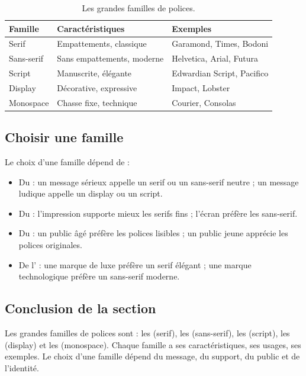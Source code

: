 \begin{table}[h!]
\centering
\begin{tabular}{@{}lll@{}}
\toprule
\textbf{Famille} & \textbf{Caractéristiques} & \textbf{Exemples} \\
\midrule
Serif & Empattements, classique & Garamond, Times, Bodoni \\
Sans-serif & Sans empattements, moderne & Helvetica, Arial, Futura \\
Script & Manuscrite, élégante & Edwardian Script, Pacifico \\
Display & Décorative, expressive & Impact, Lobster \\
Monospace & Chasse fixe, technique & Courier, Consolas \\
\bottomrule
\end{tabular}
\caption{Les grandes familles de polices.}
\end{table}

\subsection{Choisir une famille}

Le choix d'une famille dépend de :

\begin{itemize}
    \item Du  : un message sérieux appelle un serif ou un sans-serif neutre ; un message ludique appelle un display ou un script.
    \item Du  : l'impression supporte mieux les serifs fins ; l'écran préfère les sans-serif.
    \item Du  : un public âgé préfère les polices lisibles ; un public jeune apprécie les polices originales.
    \item De l' : une marque de luxe préfère un serif élégant ; une marque technologique préfère un sans-serif moderne.
\end{itemize}

\subsection*{Conclusion de la section}

\begin{retenir}
Les grandes familles de polices sont : les  (serif), les  (sans-serif), les  (script), les  (display) et les  (monospace). Chaque famille a ses caractéristiques, ses usages, ses exemples. Le choix d'une famille dépend du message, du support, du public et de l'identité.
\end{retenir}

